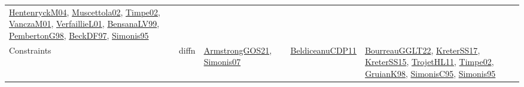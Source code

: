 {\begin{longtable}{lp{3cm}>{\raggedright}p{6cm}>{\raggedright}p{6cm}p{8cm}}
\href{papers/HentenryckM04.pdf}{HentenryckM04}\cite{HentenryckM04}, \href{papers/Muscettola02.pdf}{Muscettola02}\cite{Muscettola02}, \href{articles/Timpe02.pdf}{Timpe02}\cite{Timpe02}, \href{papers/VanczaM01.pdf}{VanczaM01}\cite{VanczaM01}, \href{papers/VerfaillieL01.pdf}{VerfaillieL01}\cite{VerfaillieL01}, \href{articles/BensanaLV99.pdf}{BensanaLV99}\cite{BensanaLV99}, \href{papers/PembertonG98.pdf}{PembertonG98}\cite{PembertonG98}, \href{papers/BeckDF97.pdf}{BeckDF97}\cite{BeckDF97}, \href{papers/Simonis95.pdf}{Simonis95}\cite{Simonis95}\\
Constraints & diffn & \href{papers/ArmstrongGOS21.pdf}{ArmstrongGOS21}\cite{ArmstrongGOS21}, \href{articles/Simonis07.pdf}{Simonis07}\cite{Simonis07} & \href{articles/BeldiceanuCDP11.pdf}{BeldiceanuCDP11}\cite{BeldiceanuCDP11} & \href{articles/BourreauGGLT22.pdf}{BourreauGGLT22}\cite{BourreauGGLT22}, \href{articles/KreterSS17.pdf}{KreterSS17}\cite{KreterSS17}, \href{papers/KreterSS15.pdf}{KreterSS15}\cite{KreterSS15}, \href{articles/TrojetHL11.pdf}{TrojetHL11}\cite{TrojetHL11}, \href{articles/Timpe02.pdf}{Timpe02}\cite{Timpe02}, \href{papers/GruianK98.pdf}{GruianK98}\cite{GruianK98}, \href{papers/SimonisC95.pdf}{SimonisC95}\cite{SimonisC95}, \href{papers/Simonis95.pdf}{Simonis95}\cite{Simonis95}\\

\end{longtable}}
